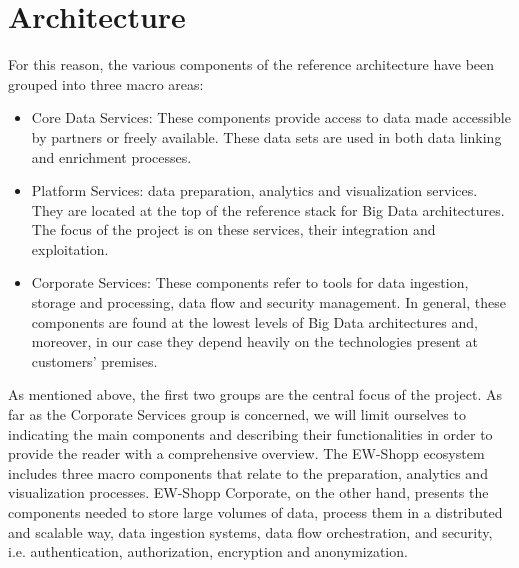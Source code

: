 \section{Architecture}\label{sec:architecture}




For this reason, the various components of the reference architecture have been grouped into three macro areas:

\begin{itemize}
    \item Core Data Services: These components provide access to data made accessible by partners or freely available. These data sets are used in both data linking and enrichment processes.
    \item Platform Services: data preparation, analytics and visualization services. They are located at the top of the reference stack for Big Data architectures. The focus of the project is on these services, their integration and exploitation.
    \item Corporate Services: These components refer to tools for data ingestion, storage and processing, data flow and security management. In general, these components are found at the lowest levels of Big Data architectures and, moreover, in our case they depend heavily on the technologies present at customers' premises.  
\end{itemize}

As mentioned above, the first two groups are the central focus of the project. 
As far as the Corporate Services group is concerned, we will limit ourselves to indicating the main components and describing their functionalities in order to provide the reader with a comprehensive overview.  
The EW-Shopp ecosystem includes three macro components that relate to the preparation, analytics and visualization processes. 
EW-Shopp Corporate, on the other hand, presents the components needed to store large volumes of data, process them in a distributed and scalable way, data ingestion systems, data flow orchestration, and security, i.e. authentication, authorization, encryption and anonymization. 
 
